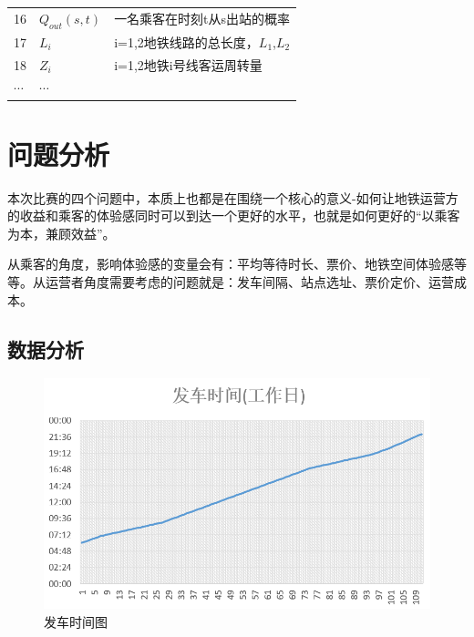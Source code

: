 \documentclass[12pt,a4paper]{mcmthesis}
\begin{document}
\begin{table}[h]
\begin{tabular}{p{60pt}<{\centering}|p{60pt}<{\centering}p{180pt}<{\raggedright}}
            16          & $Q_{out}(s,t)$      & 一名乘客在时刻t从s出站的概率                        \\
            17          & $L_i$               & i={1,2}地铁线路的总长度，$L_1$,$L_2$            \\
            18          & $Z_i$               & i={1,2}地铁i号线客运周转量                      \\
            $\cdots$ & $\cdots$ \\
            \hline
        \end{tabular}
        \label{symbol}
    \end{table}


    \section{问题分析}

    本次比赛的四个问题中，本质上也都是在围绕一个核心的意义-如何让地铁运营方的收益和乘客的体验感同时可以到达一个更好的水平，也就是如何更好的“以乘客为本，兼顾效益”。

    从乘客的角度，影响体验感的变量会有：平均等待时长、票价、地铁空间体验感等等。从运营者角度需要考虑的问题就是：发车间隔、站点选址、票价定价、运营成本。

    \subsection{数据分析}
    \begin{figure}[h!t]
        \centerline{\includegraphics[scale=0.6]{figures/发车时间图}\quad}
        \caption{\song\wuhao 发车时间图}
        \label{fig:发车时间图}
    \end{figure}
\end{document}
